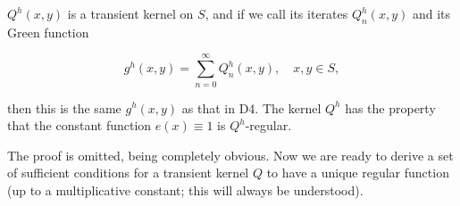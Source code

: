 $Q^h(x,y)$ is a transient kernel on $S$, and if we call its iterates $Q_n^h(x,y)$ and its Green function

$$g^h(x,y) = \sum_{n=0}^{\infty} Q_n^h(x,y), \quad x,y \in S,$$

then this is the same $g^h(x,y)$ as that in D4. The kernel $Q^h$ has the property that the constant function $e(x) \equiv 1$ is $Q^h$-regular.

The proof is omitted, being completely obvious. Now we are ready to derive a set of sufficient conditions for a transient kernel $Q$ to have a unique regular function (up to a multiplicative constant; this will always be understood).